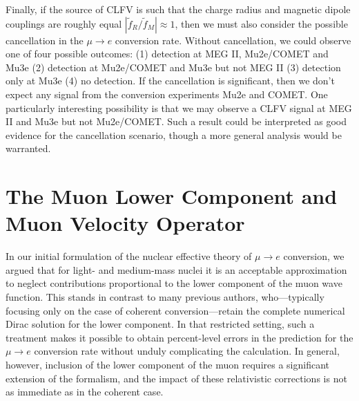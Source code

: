 \documentclass{book}[letterpaper,12pt]
\begin{document}
Finally, if the source of CLFV is such that the charge radius and magnetic dipole couplings are roughly equal $|\tilde{f}_R/\tilde{f}_M|\approx 1$, then we must also consider the possible cancellation in the $\mu\rightarrow e$ conversion rate. Without cancellation, we could observe one of four possible outcomes: (1) detection at MEG II, Mu2e/COMET and Mu3e (2) detection at Mu2e/COMET and Mu3e but not MEG II (3) detection only at Mu3e (4) no detection. If the cancellation is significant, then we don't expect any signal from the conversion experiments Mu2e and COMET. One particularly interesting possibility is that we may observe a CLFV signal at MEG II and Mu3e but not Mu2e/COMET. Such a result could be interpreted as good evidence for the cancellation scenario, though a more general analysis would be warranted.
\chapter{The Muon Lower Component and Muon Velocity Operator}
\label{chap:muon_lower}
In our initial formulation of the nuclear effective theory of $\mu\rightarrow e$ conversion, we argued that for light- and medium-mass nuclei it is an acceptable approximation to neglect contributions proportional to the lower component of the muon wave function. This stands in contrast to many previous authors, who---typically focusing only on the case of coherent conversion---retain the complete numerical Dirac solution for the lower component. In that restricted setting, such a treatment makes it possible to obtain percent-level errors in the prediction for the $\mu\rightarrow e$ conversion rate without unduly complicating the calculation. In general, however, inclusion of the lower component of the muon requires a significant extension of the formalism, and the impact of these relativistic corrections is not as immediate as in the coherent case.  
\end{document}
